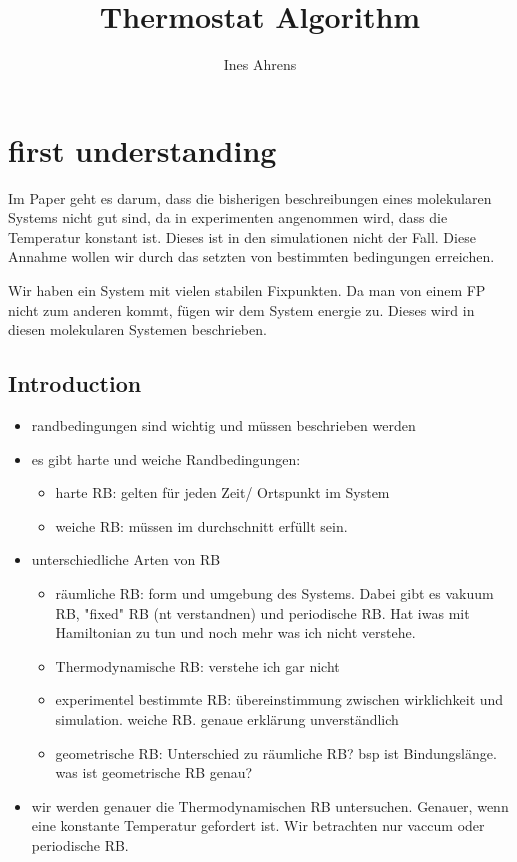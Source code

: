 \documentclass[]{article}
\title{Thermostat Algorithm}
\author{Ines Ahrens}
\begin{document}
\maketitle

\begin{abstract}

\end{abstract}

\section{first understanding}

Im Paper geht es darum, dass die bisherigen beschreibungen eines molekularen Systems nicht gut sind, da in experimenten angenommen wird, dass die Temperatur konstant ist. Dieses ist in den simulationen nicht der Fall. Diese Annahme wollen wir durch das setzten von bestimmten bedingungen erreichen. 

Wir haben ein System mit vielen stabilen Fixpunkten. Da man von einem FP nicht zum anderen kommt, fügen wir dem System energie zu. Dieses wird in diesen molekularen Systemen beschrieben. 

\subsection{Introduction}
\begin{itemize}
	\item randbedingungen sind wichtig und müssen beschrieben werden
	\item es gibt harte und weiche Randbedingungen:
	\begin{itemize}
		\item harte RB: gelten für jeden Zeit/ Ortspunkt im System
		\item weiche RB: müssen im durchschnitt erfüllt sein. 
	\end{itemize}
	\item unterschiedliche Arten von RB
	\begin{itemize}
		\item räumliche RB: form und umgebung des Systems. Dabei gibt es vakuum RB, "fixed" RB (nt verstandnen) und periodische RB. Hat iwas mit Hamiltonian zu tun und noch mehr was ich nicht verstehe. 
		\item Thermodynamische RB: verstehe ich gar nicht
		\item experimentel bestimmte RB: übereinstimmung zwischen wirklichkeit und simulation. weiche RB. genaue erklärung unverständlich
		\item geometrische RB: Unterschied zu räumliche RB? bsp ist Bindungslänge. was ist geometrische RB genau?  
	\end{itemize}
	\item wir werden genauer die Thermodynamischen RB untersuchen. Genauer, wenn eine konstante Temperatur gefordert ist. Wir betrachten nur vaccum oder periodische RB. 
\end{itemize}
\end{document}
